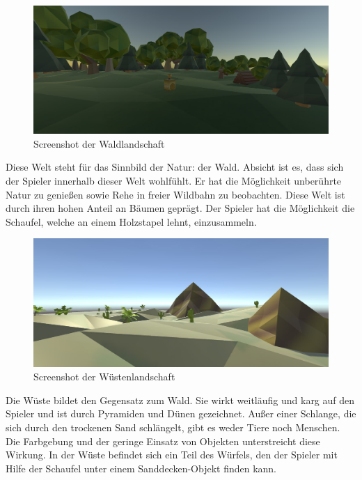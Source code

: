
\begin{figure}[!htbp]%
	\centering
		\includegraphics[width=1.0\textwidth]{images/Wald}
	\caption{Screenshot der Waldlandschaft}
	\label{fig:Wald}
\end{figure}

Diese Welt steht für das Sinnbild der Natur: der Wald. Absicht ist es, dass sich der Spieler innerhalb dieser Welt wohlfühlt. Er hat die Möglichkeit unberührte Natur zu genießen sowie Rehe in freier Wildbahn zu beobachten. Diese Welt ist durch ihren hohen Anteil an Bäumen geprägt. Der Spieler hat die Möglichkeit die Schaufel, welche an einem Holzstapel lehnt, einzusammeln.


\begin{figure}[!htbp]%
	\centering
		\includegraphics[width=1.0\textwidth]{images/Wueste}
	\caption{Screenshot der Wüstenlandschaft}
	\label{fig:Wueste}
\end{figure}

Die Wüste bildet den Gegensatz zum Wald. Sie wirkt weitläufig und karg auf den Spieler und ist durch Pyramiden und Dünen gezeichnet. Außer einer Schlange, die sich durch den trockenen Sand schlängelt, gibt es weder Tiere noch Menschen.
Die Farbgebung und der geringe Einsatz von Objekten unterstreicht diese Wirkung. In der Wüste befindet sich ein Teil des Würfels, den der Spieler mit Hilfe der Schaufel unter einem Sanddecken-Objekt finden kann.  


